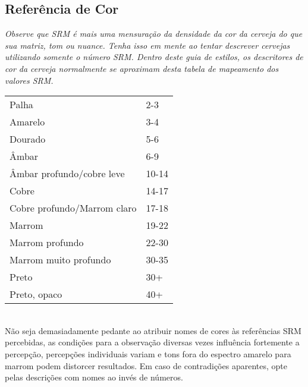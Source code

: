 \subsection*{Referência de Cor}

\textit{Observe que SRM é mais uma mensuração da densidade da cor da cerveja do que sua matriz, tom ou nuance. Tenha isso em mente ao tentar descrever cervejas utilizando somente o número SRM. Dentro deste guia de estilos, os descritores de cor da cerveja normalmente se aproximam desta tabela de mapeamento dos valores SRM.}\\

\begin{tabular}{ l l }
Palha & 2-3 \\
Amarelo & 3-4 \\
Dourado & 5-6 \\
Âmbar & 6-9 \\
Âmbar profundo/cobre leve & 10-14 \\
Cobre & 14-17 \\
Cobre profundo/Marrom claro & 17-18 \\
Marrom & 19-22 \\
Marrom profundo & 22-30 \\
Marrom muito profundo & 30-35 \\
Preto & 30+ \\
Preto, opaco & 40+
\end{tabular}\\

Não seja demasiadamente pedante ao atribuir nomes de cores às referências SRM percebidas, as condições para a observação diversas vezes influência fortemente a percepção, percepções individuais variam e tons fora do espectro amarelo para marrom podem distorcer resultados. Em caso de contradições aparentes, opte pelas descrições com nomes ao invés de números.
